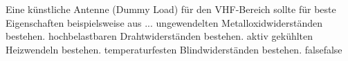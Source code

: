     {Eine künstliche Antenne (Dummy Load) für den VHF-Bereich sollte für beste Eigenschaften beispielsweise aus ...}
    {ungewendelten Metalloxidwiderständen bestehen.}
    {hochbelastbaren Drahtwiderständen bestehen.}
    {aktiv gekühlten Heizwendeln bestehen.}
    {temperaturfesten Blindwiderständen bestehen.}
    {false}{false}